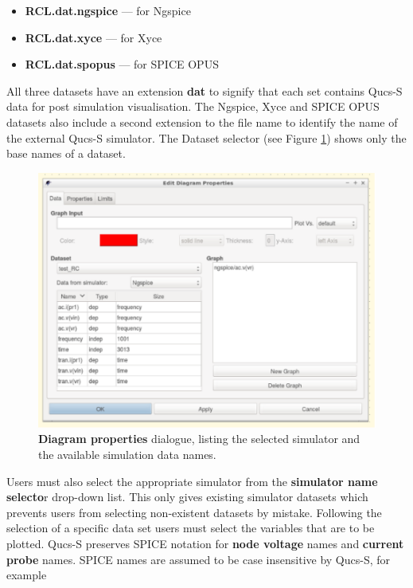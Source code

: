 \documentclass[10pt, a4paper]{report}
\begin{document}
\begin{itemize}
	\item {\textbf{RCL.dat.ngspice} --- for Ngspice}
	\item {\textbf{RCL.dat.xyce}    --- for Xyce }
	\item {\textbf{RCL.dat.spopus}  --- for SPICE OPUS}
\end{itemize}

\noindent All three datasets have an extension \textbf{dat} to signify that each set contains Qucs-S data for post simulation visualisation. The Ngspice, Xyce and SPICE OPUS datasets also include a second extension to the file name to identify the name of the external Qucs-S simulator. The Dataset selector (see Figure \ref{Fig13}) shows only the base names of a dataset. 

 \begin{figure}[h]
	\centering
	\includegraphics[width=14cm]{pics/chap2/Diagr_dlg.pdf}
	\caption{\textbf{Diagram properties} dialogue, listing the selected simulator and the available simulation data names. }
	\label{Fig13}
\end{figure}

\noindent Users must also select the appropriate simulator from the \textbf{simulator name selecto}r drop-down list. This only gives existing simulator datasets which prevents users from selecting non-existent datasets by mistake. Following the selection of a specific data set users must select the variables that are to be plotted.  Qucs-S preserves SPICE notation for \textbf{node voltage} names and \textbf{current probe} names.  SPICE names are assumed to be case insensitive by Qucs-S, for example
\end{document}
